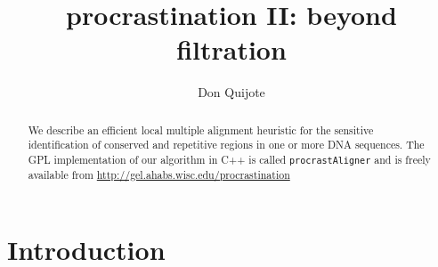 \documentclass{llncs}
\begin{document}
\frontmatter          %
%
\pagestyle{headings}  %

\mainmatter              %
%
\title{procrastination II: beyond filtration}
%
\author{Don Quijote}
%
%


\maketitle


\begin{abstract}
We describe an efficient local multiple alignment 
heuristic for the sensitive identification of 
conserved and repetitive regions in one or more DNA
sequences.  The GPL implementation of our algorithm in C++ is
called \texttt{procrastAligner} and is freely available from
\url{http://gel.ahabs.wisc.edu/procrastination}
\end{abstract}


\section{ Introduction }
\end{document}
